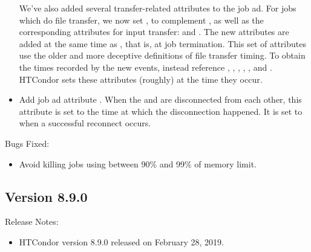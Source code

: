 \begin{itemize}
We've also added several transfer-related attributes to the job ad.  For jobs
which do file transfer, we now set
, to complement
, as well as the corresponding
attributes for input transfer:
 and
.  The new attributes are added at
the same time as , that is, at
job termination.  This set of attributes use the older and more deceptive
definitions of file transfer timing.  To obtain the times recorded by the
new events, instead reference ,
, ,
, , and
.  HTCondor sets these attributes (roughly) at
the time they occur.


\item Add job ad attribute .
When the  and  are disconnected from each
other, this attribute is set to the time at which the disconnection
happened.
It is set to  when a successful reconnect occurs.

\end{itemize}

\noindent Bugs Fixed:

\begin{itemize}

\item Avoid killing jobs using between 90\% and 99\% of memory limit. 

\end{itemize}

\subsection*{\label{sec:New-8-9-0}Version 8.9.0}

\noindent Release Notes:

\begin{itemize}

\item HTCondor version 8.9.0 released on February 28, 2019.

\end{itemize}

